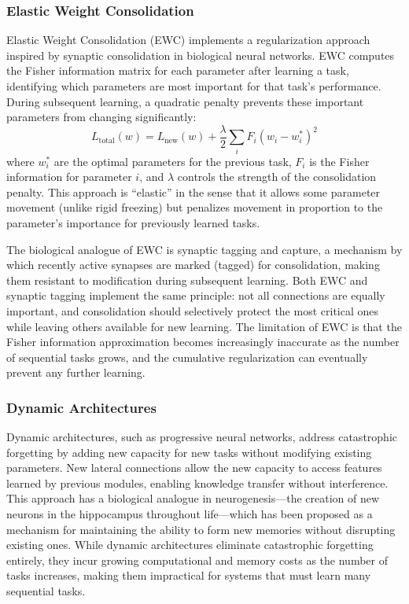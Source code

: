 \documentclass[11pt,letterpaper]{article}
\begin{document}
\subsubsection{Elastic Weight Consolidation}

Elastic Weight Consolidation (EWC) \cite{kirkpatrick2017overcoming} implements a regularization approach inspired by synaptic consolidation in biological neural networks. EWC computes the Fisher information matrix for each parameter after learning a task, identifying which parameters are most important for that task's performance. During subsequent learning, a quadratic penalty prevents these important parameters from changing significantly:
\begin{equation}
L_{\text{total}}(w) = L_{\text{new}}(w) + \frac{\lambda}{2} \sum_i F_i (w_i - w_i^*)^2
\end{equation}
where $w_i^*$ are the optimal parameters for the previous task, $F_i$ is the Fisher information for parameter $i$, and $\lambda$ controls the strength of the consolidation penalty. This approach is ``elastic'' in the sense that it allows some parameter movement (unlike rigid freezing) but penalizes movement in proportion to the parameter's importance for previously learned tasks.

The biological analogue of EWC is synaptic tagging and capture, a mechanism by which recently active synapses are marked (tagged) for consolidation, making them resistant to modification during subsequent learning. Both EWC and synaptic tagging implement the same principle: not all connections are equally important, and consolidation should selectively protect the most critical ones while leaving others available for new learning. The limitation of EWC is that the Fisher information approximation becomes increasingly inaccurate as the number of sequential tasks grows, and the cumulative regularization can eventually prevent any further learning.

\subsubsection{Dynamic Architectures}

Dynamic architectures, such as progressive neural networks, address catastrophic forgetting by adding new capacity for new tasks without modifying existing parameters. New lateral connections allow the new capacity to access features learned by previous modules, enabling knowledge transfer without interference. This approach has a biological analogue in neurogenesis---the creation of new neurons in the hippocampus throughout life---which has been proposed as a mechanism for maintaining the ability to form new memories without disrupting existing ones. While dynamic architectures eliminate catastrophic forgetting entirely, they incur growing computational and memory costs as the number of tasks increases, making them impractical for systems that must learn many sequential tasks.
\end{document}
